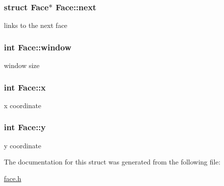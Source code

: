 \subsubsection[{next}]{\setlength{\rightskip}{0pt plus 5cm}struct {\bf Face}$\ast$ Face\+::next}\label{structFace_a14dedefeea97ab2adb16dfd611f599e2}


links to the next face 

\hypertarget{structFace_ad14137f7ed032d76e6c0cdfe43854586}{}
\subsubsection[{window}]{\setlength{\rightskip}{0pt plus 5cm}int Face\+::window}\label{structFace_ad14137f7ed032d76e6c0cdfe43854586}


window size 

\hypertarget{structFace_a48dccc7c51f71aa8dae21716774ed122}{}
\subsubsection[{x}]{\setlength{\rightskip}{0pt plus 5cm}int Face\+::x}\label{structFace_a48dccc7c51f71aa8dae21716774ed122}


x coordinate 

\hypertarget{structFace_a618b931140f2332b17f102e0acea251f}{}
\subsubsection[{y}]{\setlength{\rightskip}{0pt plus 5cm}int Face\+::y}\label{structFace_a618b931140f2332b17f102e0acea251f}


y coordinate 



The documentation for this struct was generated from the following file\+:\begin{DoxyCompactItemize}
\item 
\hyperlink{face_8h}{face.\+h}\end{DoxyCompactItemize}
